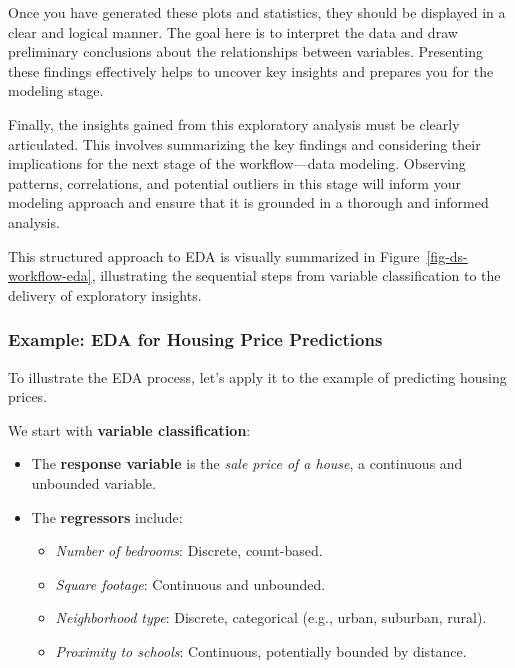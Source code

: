 \documentclass[
  letterpaper,
  DIV=11,
  numbers=noendperiod]{scrreprt}
\providecommand{\tightlist}{%
  \setlength{\itemsep}{0pt}\setlength{\parskip}{0pt}}\usepackage{longtable,booktabs,array}
\begin{document}
Once you have generated these plots and statistics, they should be
displayed in a clear and logical manner. The goal here is to interpret
the data and draw preliminary conclusions about the relationships
between variables. Presenting these findings effectively helps to
uncover key insights and prepares you for the modeling stage.

Finally, the insights gained from this exploratory analysis must be
clearly articulated. This involves summarizing the key findings and
considering their implications for the next stage of the workflow---data
modeling. Observing patterns, correlations, and potential outliers in
this stage will inform your modeling approach and ensure that it is
grounded in a thorough and informed analysis.

This structured approach to EDA is visually summarized in
Figure~\ref{fig-ds-workflow-eda}, illustrating the sequential steps from
variable classification to the delivery of exploratory insights.

\subsubsection{Example: EDA for Housing Price
Predictions}\label{example-eda-for-housing-price-predictions}

To illustrate the EDA process, let's apply it to the example of
predicting housing prices.

We start with \textbf{variable classification}:

\begin{itemize}
\tightlist
\item
  The \textbf{response variable} is the \emph{sale price of a house}, a
  continuous and unbounded variable.
\item
  The \textbf{regressors} include:

  \begin{itemize}
  \tightlist
  \item
    \emph{Number of bedrooms}: Discrete, count-based.
  \item
    \emph{Square footage}: Continuous and unbounded.
  \item
    \emph{Neighborhood type}: Discrete, categorical (e.g., urban,
    suburban, rural).
  \item
    \emph{Proximity to schools}: Continuous, potentially bounded by
    distance.
  \end{itemize}
\end{itemize}
\end{document}
